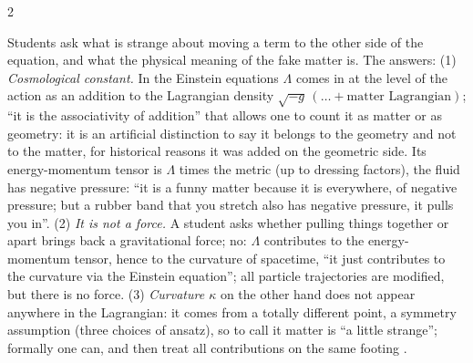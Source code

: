 \begin{paracol}{2}
\begin{coursenote}
Students ask what is strange about moving a term to the other side of the equation, and what the physical meaning of the fake matter is. The answers: (1) \emph{Cosmological constant.} In the Einstein equations $\Lambda$ comes in at the level of the action as an addition to the Lagrangian density $\sqrt{-g}\,(\dots+\text{matter Lagrangian})$; ``it is the associativity of addition'' that allows one to count it as matter or as geometry: it is an artificial distinction to say it belongs to the geometry and not to the matter, for historical reasons it was added on the geometric side. Its energy-momentum tensor is $\Lambda$ times the metric (up to dressing factors), the fluid has negative pressure: ``it is a funny matter because it is everywhere, of negative pressure; but a rubber band that you stretch also has negative pressure, it pulls you in''. (2) \emph{It is not a force.} A student asks whether pulling things together or apart brings back a gravitational force; no: $\Lambda$ contributes to the energy-momentum tensor, hence to the curvature of spacetime, ``it just contributes to the curvature via the Einstein equation''; all particle trajectories are modified, but there is no force. (3) \emph{Curvature $\kappa$} on the other hand does not appear anywhere in the Lagrangian: it comes from a totally different point, a symmetry assumption (three choices of ansatz), so to call it matter is ``a little strange''; formally one can, and then treat all contributions on the same footing .
\end{coursenote}


\end{paracol}
